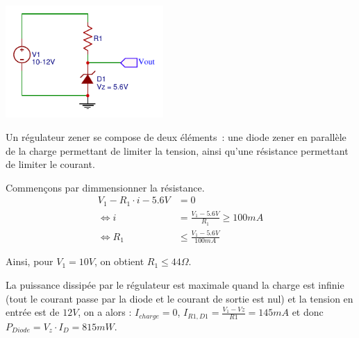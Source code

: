 \documentclass{../template/tp}
\begin{document}
{%
\begin{center}
    \includegraphics[width=6cm]{corexzener}
\end{center}
Un régulateur zener se compose de deux éléments~: une diode zener en parallèle de la charge permettant de limiter la tension, ainsi qu'une résistance permettant de limiter le courant.

Commençons par dimmensionner la résistance.
\begin{align*}
V_1 - R_1 \cdot i - 5.6V & = 0 \\
\Leftrightarrow i & = \frac{V_1 - 5.6V}{R_1} \geq 100 mA \\
\Leftrightarrow R_1 & \leq \frac{V_1 - 5.6V}{100 mA}
\end{align*}

Ainsi, pour $V_1 = 10 V$, on obtient $R_1 \leq 44 \Omega$.


La puissance dissipée par le régulateur est maximale quand la charge est infinie (tout le courant passe par la diode et le courant de sortie est nul) et la tension en entrée est de $12V$, on a alors : $I_{charge}=0$, $I_{R1,D1} = \frac{V_1 - Vz}{R1} = 145mA$ et donc $P_{Diode} = V_z \cdot I_D = 815mW$.
}
\end{document}
